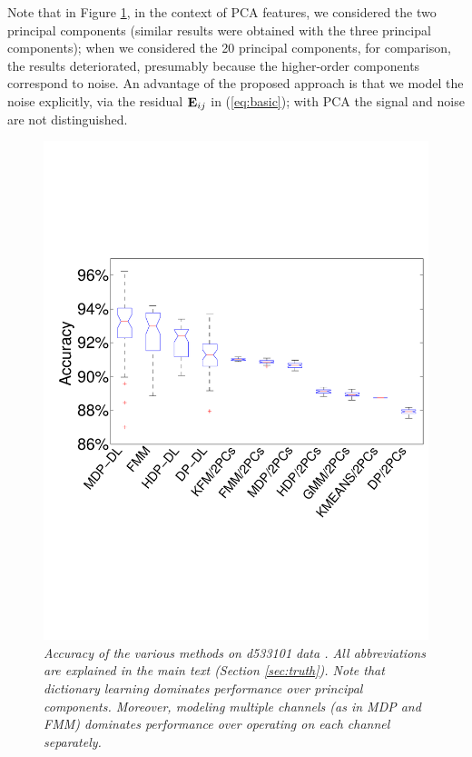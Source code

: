 \documentclass[journal]{IEEEtran}
\begin{document}
Note that in Figure \ref{fig:Accuracy_hc_1}, in the context of PCA features, we considered the two principal components (similar results were obtained with the three principal components); when we considered the 20 principal components, for comparison, the results deteriorated, presumably because the higher-order components correspond to noise. An advantage of the proposed approach is that we model the noise explicitly, via the residual ${\mathbf E}_{ij}$ in (\ref{eq:basic}); with PCA the signal and noise are not distinguished. 

\begin{figure}[h!]
  \centering
    \includegraphics[width=1.0\linewidth]{figs_new/Accuracy_hc_1.pdf}
    \caption{\textit{\small{ Accuracy of the various methods on d533101 data \cite{Henze2000}. All abbreviations are explained in the main text (Section \ref{sec:truth}).  Note that dictionary learning dominates performance over principal components.  Moreover, modeling multiple channels (as in MDP and FMM) dominates performance over operating on each channel separately.   
}}}
\label{fig:Accuracy_hc_1}
\end{figure}
\end{document}
